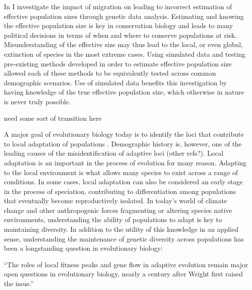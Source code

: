 In  I investigate the impact of migration on leading to incorrect estimation of effective population sizes through genetic data analysis. Estimating and knowing the effective population size is key in conservation biology and leads to many political decisions in terms of when and where to conserve populations at risk. Misunderstanding of the effective size may thus lead to the local, or even global, extinction of species in the most extreme cases. Using simulated data and testing pre-existing methods developed in order to estimate effective population size allowed each of these methods to be equivalently tested across common demographic scenarios. Use of simulated data benefits this investigation by having knowledge of the true effective population size, which otherwise in nature is never truly possible.

\color{red}need some sort of transition here\color{black}

A major goal of evolutionary biology today is to identify the loci that contribute to local adaptation of populations \citep{Savolainen:2013, Whitlock:2015, LeCorre:2012, Coop:2010}. Demographic history is, however, one of the leading causes of the misidentification of adaptive loci \citep{Whitlock:2015}(\color{red}other refs?\color{black}). Local adaptation is an important in the process of evolution for many reason. Adapting to the local environment is what allows many species to exist across a range of conditions. In some cases, local adaptation can also be considered an early stage in the process of speciation, contributing to differentiation among populations that eventually become reproductively isolated. In today's world of climate change and other anthropogenic forces fragmenting or altering species native environments, understanding the ability of populations to adapt is key to maintaining diversity. In addition to the utility of this knowledge in an applied sense, understanding the maintenance of genetic diversity across populations has been a longstanding question in evolutionary biology:
\begin{quoteshrink}
  ``The roles of local fitness peaks and gene flow in adaptive evolution remain major open questions in evolutionary biology, nearly a century after Wright first raised the issue.''
  \hfill\citet{Barton:2016}
\end{quoteshrink}

